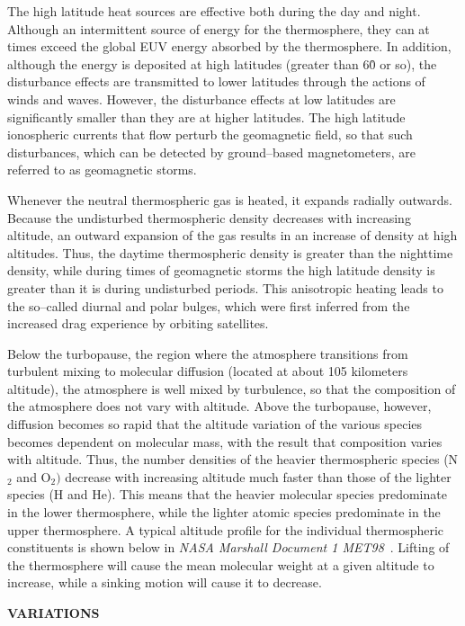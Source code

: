 The high latitude heat sources are effective both during the day and night.
Although an intermittent source of energy for the thermosphere, they can at
times exceed the global EUV energy absorbed by the thermosphere.  In
addition, although the energy is deposited at high latitudes (greater than
60\r{ } or so), the disturbance effects are transmitted to lower latitudes
through the actions of winds and waves.  However, the disturbance effects at
low latitudes are significantly smaller than they are at higher latitudes.
The high latitude ionospheric currents that flow perturb the geomagnetic
field, so that such disturbances, which can be detected by ground--based
magnetometers, are referred to as geomagnetic storms.

Whenever the neutral thermospheric gas is heated, it expands radially
outwards.  Because the undisturbed thermospheric density decreases with
increasing altitude, an outward expansion of the gas results in an increase
of density at high altitudes.  Thus, the daytime thermospheric density is
greater than the nighttime density, while during times of geomagnetic storms
the high latitude density is greater than it is during undisturbed periods.
This anisotropic heating leads to the so--called diurnal and polar bulges,
which were first inferred from the increased drag experience by orbiting
satellites.

Below the turbopause, the region where the atmosphere transitions from
turbulent mixing to molecular diffusion (located at about 105 kilometers
altitude), the atmosphere is well mixed by turbulence, so that the
composition of the atmosphere does not vary with altitude.  Above the
turbopause, however, diffusion becomes so rapid that the altitude variation
of the various species becomes dependent on molecular mass, with the result
that composition varies with altitude.  Thus, the number densities of the
heavier thermospheric species (N$_{2}$ and O$_{2})$ decrease with increasing
altitude much faster than those of the lighter species (H and He).  This
means that the heavier molecular species predominate in the lower
thermosphere, while the lighter atomic species predominate in the upper
thermosphere.  A typical altitude profile for the individual thermospheric
constituents is shown below in {\em NASA Marshall Document 1 MET98}~\cite{Hickey}.
Lifting of the thermosphere will cause the mean molecular weight at a given
altitude to increase, while a sinking motion will cause it to decrease.

\textbf{VARIATIONS}

